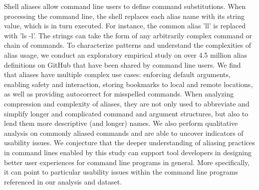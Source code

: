 Shell aliases allow command line users to define command substitutions.
When processing the command line, the shell replaces each alias name with its string value, which is in turn executed.
For instance, the common alias 'll' is replaced with 'ls -l'.
The strings can take the form of any arbitrarily complex command or chain of commands.
To characterize patterns and understand the complexities of alias usage, we conduct an exploratory empirical study on over 4.5 million alias definitions on GitHub that have been shared by command line users.
We find that aliases have multiple complex use cases: enforcing default arguments, enabling safety and interaction, storing bookmarks to local and remote locations, as well as providing autocorrect for misspelled commands.
When analyzing compression and complexity of aliases, they are not only used to abbreviate and simplify longer and complicated command and argument structures, but also to lend them more descriptive (and longer) names.
We also perform qualitative analysis on commonly aliased commands and are able to uncover indicators of usability issues.
We conjecture that the deeper understanding of aliasing practices in command lines enabled by this study can support tool developers in designing better user experiences for command line programs in general.
More specifically, it can point to particular usability issues within the command line programs referenced in our analysis and dataset.